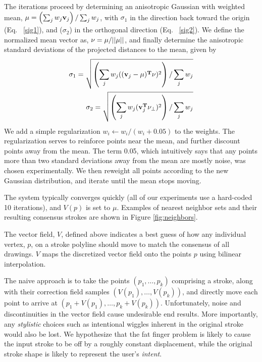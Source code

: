 The iterations proceed by determining an anisotropic Gaussian with weighted mean, ${\bf \mu} = \left(\sum_j w_j {\bf v}_j\right) / \sum_j w_j$, with
$\sigma_1$ in the direction back toward the origin (Eq. ~\ref{sig1}), and ($\sigma_2$) in the orthogonal direction (Eq. ~\ref{sig2}). 
We define the normalized mean vector as, ${\bf \nu} = \mu/||\mu|| $,
and finally determine the anisotropic standard deviations of the projected distances to the mean, given by
\begin{eqnarray}
\sigma_1 =  \sqrt{\left(\sum_j w_j (({\bf v}_j-\mu)^{\bf T}\nu)^2\right) / \sum_j w_j} \label{sig1}\\
\sigma_2 =  \sqrt{\left(\sum_j w_j ({\bf v}_j^{\bf T}\nu_\perp)^2\right) / \sum_j w_j} \label{sig2}
\end{eqnarray}
We add a simple regularization $w_i \leftarrow w_i/ (w_i+0.05)$ to the weights.  The regularization serves to reinforce points near the mean, and further discount points away from the mean. The term 0.05, which intuitively says that any points more than two standard deviations away from the mean are mostly noise, was chosen experimentally. We then reweight all points according to the new Gaussian distribution, and iterate until the mean stops moving.

The system typically converges quickly (all of our experiments use a hard-coded 10 iterations), and $V(p)$ is set to $\mu$.  Examples of nearest neighbor sets and their resulting consensus strokes are shown in Figure \ref{fig:neighbors}.






The vector field, $V$, defined above indicates a best guess of how any individual vertex, $p$, on a stroke polyline should move to match the consensus of all drawings. $V$ maps the discretized vector field onto the points $p$ using bilinear interpolation. 

The naive approach is to take the points $(p_1, \ldots, p_k)$ comprising a stroke, along with their correction field samples $(V(p_1), \ldots, V(p_k))$, and directly move each point to arrive at $(p_1 + V(p_1), \ldots, p_k + V(p_k))$.  Unfortunately, noise and discontinuities in the vector field cause undesirable end results. More importantly, any {\em stylistic} choices such as intentional wiggles inherent in the original stroke would also be lost.  We hypothesize that the fat finger problem is likely to cause the input stroke to be off by a roughly constant displacement, while the original stroke shape is likely to represent the user's {\em intent}.

